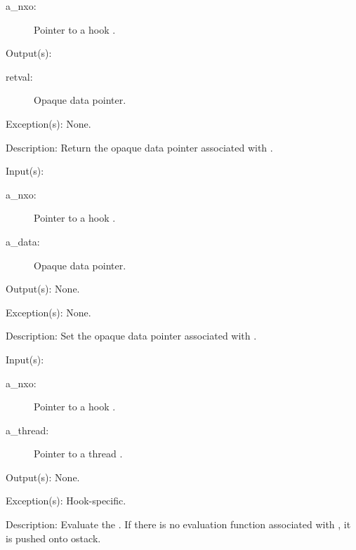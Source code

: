 \begin{capi}
\begin{capilist}
\begin{description}
		\item[a\_nxo: ]
			Pointer to a hook .
		\end{description}
	\item[Output(s): ]
		\begin{description}\item[]
		\item[retval: ]
			Opaque data pointer.
		\end{description}
	\item[Exception(s): ] None.
	\item[Description: ]
		Return the opaque data pointer associated with .
	\end{capilist}
\label{nxo_hook_data_set}
	\begin{capilist}
	\item[Input(s): ]
		\begin{description}\item[]
		\item[a\_nxo: ]
			Pointer to a hook .
		\item[a\_data: ]
			Opaque data pointer.
		\end{description}
	\item[Output(s): ] None.
	\item[Exception(s): ] None.
	\item[Description: ]
		Set the opaque data pointer associated with .
	\end{capilist}
\label{nxo_hook_eval}
	\begin{capilist}
	\item[Input(s): ]
		\begin{description}\item[]
		\item[a\_nxo: ]
			Pointer to a hook \classname{nxo}.
		\item[a\_thread: ]
			Pointer to a thread \classname{nxo}.
		\end{description}
	\item[Output(s): ] None.
	\item[Exception(s): ] Hook-specific.
	\item[Description: ]
		Evaluate the .  If there is no evaluation function
		associated with , it is pushed onto ostack.
	\end{capilist}
\end{capi}
